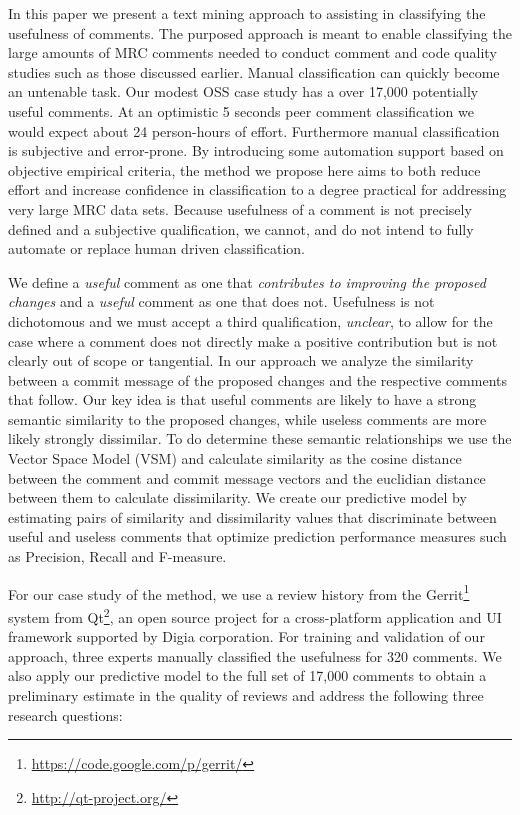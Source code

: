 In this paper we present a text mining approach to assisting in classifying the usefulness of comments. The purposed approach is meant to enable classifying the large amounts of MRC comments needed to conduct comment and code quality studies such as those discussed earlier. Manual classification can quickly become an untenable task. Our modest OSS case study has a over 17,000 potentially useful comments. At an optimistic 5 seconds peer comment classification we would expect about 24 person-hours of effort. Furthermore manual classification is subjective and error-prone. By introducing some automation support based on objective empirical criteria, the method we propose here aims to both reduce effort and increase confidence in classification to a degree practical for addressing very large MRC data sets. Because usefulness of a comment is not precisely defined and a subjective qualification, we cannot, and do not intend to fully automate or replace human driven classification.  

We define a \emph{useful} comment as one that \emph{contributes to improving the proposed changes} and a \emph{useful} comment as one that does not. Usefulness is not dichotomous and we must accept a third qualification, \emph{unclear}, to allow for the case where a comment does not directly make a positive contribution but is not clearly out of scope or tangential. In our approach we analyze the similarity between a commit message of the proposed changes and the respective comments that follow. Our key idea is that useful comments are likely to have a strong semantic similarity to the proposed changes, while useless comments are more likely strongly dissimilar. To do determine these semantic relationships we use the Vector Space Model (VSM) and calculate similarity as the cosine distance between the comment and commit message vectors and the euclidian distance between them to calculate dissimilarity. 
We create our predictive model by estimating pairs of similarity and dissimilarity values that discriminate between useful and useless comments that optimize prediction performance measures such as Precision, Recall and F-measure.

For our case study of the method, we use a review history from the Gerrit\footnote{\url{https://code.google.com/p/gerrit/}} system from Qt\footnote{\url{http://qt-project.org/}}, an open source project for a cross-platform application and UI framework supported by Digia corporation. For training and validation of our approach, three experts manually classified the usefulness for 320 comments. We also apply our predictive model to the full set of 
17,000 
comments to obtain a preliminary estimate in the quality of reviews and address the following three research questions:


